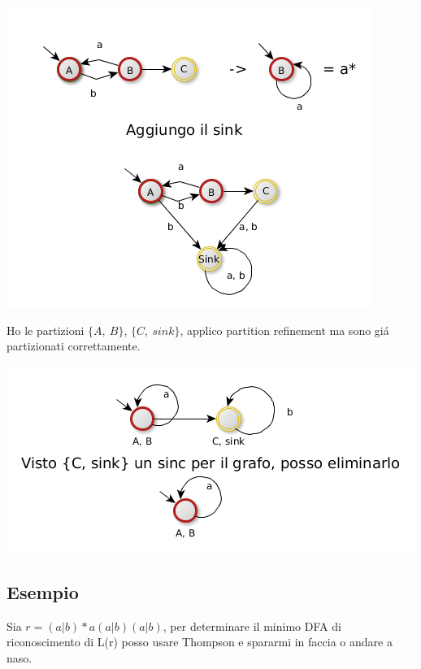 \begin{center}
	\includegraphics[scale=0.5]{Chapters/Img/c02_07.png}\\
\end{center} 

Ho le partizioni $\{A,\ B\}$, $\{C,\ sink\}$, applico partition refinement ma sono gi\'a partizionati correttamente.

\begin{center}
	\includegraphics[scale=0.5]{Chapters/Img/c02_08.png}\\
\end{center} 

\subsection{Esempio}
Sia $r=(a|b)*a(a|b)(a|b)$, per determinare il minimo DFA di riconoscimento di L(r) posso usare Thompson e spararmi in faccia o andare
a naso.

